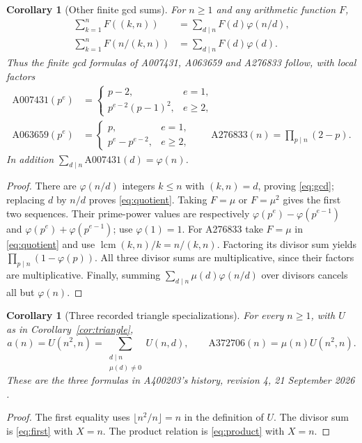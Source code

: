 \documentclass[11pt]{article}
\newtheorem{corollary}[theorem]{Corollary}
\newcommand{\mob}{\mu}
\begin{document}
\begin{corollary}[Other finite gcd sums]\label{cor:gcd}
For $n\geq1$ and any arithmetic function $F$,
\begin{align}
 \sum_{k=1}^{n}F((k,n))&=\sum_{d\mid n}F(d)\varphi(n/d),\label{eq:gcd}\\
 \sum_{k=1}^{n}F(n/(k,n))&=\sum_{d\mid n}F(d)\varphi(d).\label{eq:quotient}
\end{align}
Thus the finite gcd formulas of A007431, A063659 and A276833
\cite{a007431,a063659,a276833} follow, with local factors
\begin{align*}
 \mathrm{A007431}(p^e)&=
 \begin{cases}p-2,&e=1,\\p^{e-2}(p-1)^2,&e\geq2,\end{cases}\\
 \mathrm{A063659}(p^e)&=
 \begin{cases}p,&e=1,\\p^e-p^{e-2},&e\geq2,\end{cases}
 \qquad
 \mathrm{A276833}(n)=\prod_{p\mid n}(2-p).
\end{align*}
In addition $\sum_{d\mid n}\mathrm{A007431}(d)=\varphi(n)$.
\end{corollary}
\begin{proof}
There are $\varphi(n/d)$ integers $k\leq n$ with $(k,n)=d$,
proving \eqref{eq:gcd}; replacing $d$ by $n/d$ proves
\eqref{eq:quotient}. Taking $F=\mob$ or $F=\mob^2$ gives the first two
sequences. Their prime-power values are respectively
$\varphi(p^e)-\varphi(p^{e-1})$ and
$\varphi(p^e)+\varphi(p^{e-1})$; use $\varphi(1)=1$.
For A276833 take $F=\mob$ in \eqref{eq:quotient} and use
$\operatorname{lcm}(k,n)/k=n/(k,n)$. Factoring its divisor sum yields
$\prod_{p\mid n}(1-\varphi(p))$. All three divisor sums are
multiplicative, since their factors are multiplicative.
Finally, summing $\sum_{d\mid n}\mob(d)\varphi(n/d)$ over divisors
cancels all but $\varphi(n)$.
\end{proof}

\begin{corollary}[Three recorded triangle specializations]\label{cor:triangle-special}
For every $n\geq1$, with $U$ as in Corollary~\ref{cor:triangle},
\[
 a(n)=U(n^2,n)
 =\sum_{\substack{d\mid n\\\mob(d)\ne0}}U(n,d),
 \qquad
 \mathrm{A372706}(n)=\mob(n)U(n^2,n).
\]
These are the three formulas in A400203's history, revision 4,
21 September 2026 \cite{a400203}.
\end{corollary}
\begin{proof}
The first equality uses $\lfloor n^2/n\rfloor=n$ in the definition of $U$.
The divisor sum is \eqref{eq:first} with $X=n$.
The product relation is \eqref{eq:product} with $X=n$.
\end{proof}
\end{document}

